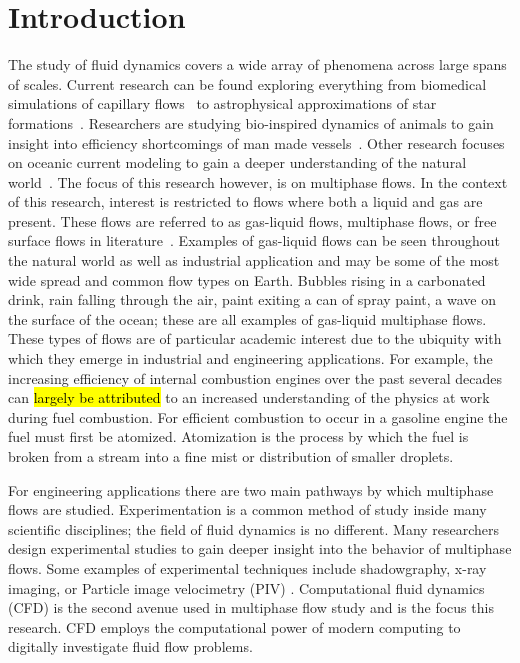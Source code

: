 \chapter{Introduction}\label{CH:introduction}


The study of fluid dynamics covers a wide array of phenomena across large spans of scales. Current research can be found exploring everything from biomedical simulations of capillary flows~\cite{1} to astrophysical approximations of star formations~\cite{1}. Researchers are studying bio-inspired dynamics of animals to gain insight into efficiency shortcomings of man made vessels~\cite{1}. Other research focuses on oceanic current modeling to gain a deeper understanding of the natural world~\cite{1}. The focus of this research however, is on multiphase flows. In the context of this research, interest is restricted to flows where both a liquid and gas are present. These flows are referred to as gas-liquid flows, multiphase flows, or free surface flows in literature~\cite{1,2,3}. Examples of gas-liquid flows can be seen throughout the natural world as well as industrial application and may be some of the most wide spread and common flow types on Earth. Bubbles rising in a carbonated drink, rain falling through the air, paint exiting a can of spray paint, a wave on the surface of the ocean; these are all examples of gas-liquid multiphase flows. These types of flows are of particular academic interest due to the ubiquity with which they emerge in industrial and engineering applications. For example, the increasing efficiency of internal combustion engines over the past several decades can \hl{largely be attributed} to an increased understanding of the physics at work during fuel combustion. For efficient combustion to occur in a gasoline engine the fuel must first be atomized. Atomization is the process by which the fuel is broken from a stream into a fine mist or distribution of smaller droplets.


For engineering applications there are two main pathways by which multiphase flows are studied. Experimentation is a common method of study inside many scientific disciplines; the field of fluid dynamics is no different. Many researchers design experimental studies to gain deeper insight into the behavior of multiphase flows. Some examples of experimental techniques include shadowgraphy, x-ray imaging, or Particle image velocimetry (PIV) . Computational fluid dynamics (CFD) is the second avenue used in multiphase flow study and is the focus this research.  CFD employs the computational power of modern computing to digitally investigate fluid flow problems. 


